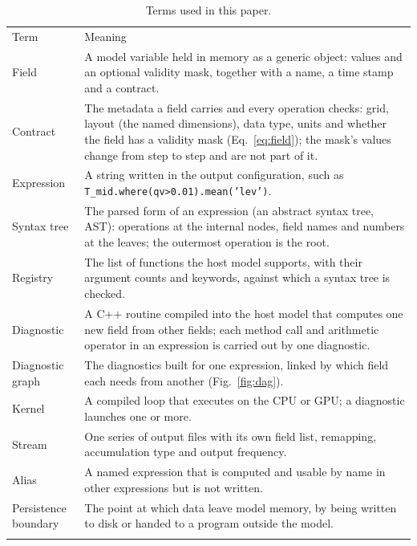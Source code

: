 \documentclass[gmd, manuscript]{copernicus}
\begin{document}
\begin{table}[t]
\caption{Terms used in this paper.}
\label{tab:terms}
\small
\begin{tabularx}{\columnwidth}{>{\raggedright\arraybackslash}p{3.0cm}>{\raggedright\arraybackslash}X}
\tophline
Term & Meaning \\
\middlehline
Field & A model variable held in memory as a generic object: values and an optional validity mask, together with a name, a time stamp and a contract. \\
Contract & The metadata a field carries and every operation checks: grid, layout (the named dimensions), data type, units and whether the field has a validity mask (Eq.~\ref{eq:field}); the mask's values change from step to step and are not part of it. \\
Expression & A string written in the output configuration, such as \texttt{T\_mid.where(qv>0.01).mean('lev')}. \\
Syntax tree & The parsed form of an expression (an abstract syntax tree, AST): operations at the internal nodes, field names and numbers at the leaves; the outermost operation is the root. \\
Registry & The list of functions the host model supports, with their argument counts and keywords, against which a syntax tree is checked. \\
Diagnostic & A C++ routine compiled into the host model that computes one new field from other fields; each method call and arithmetic operator in an expression is carried out by one diagnostic. \\
Diagnostic graph & The diagnostics built for one expression, linked by which field each needs from another (Fig.~\ref{fig:dag}). \\
Kernel & A compiled loop that executes on the CPU or GPU; a diagnostic launches one or more. \\
Stream & One series of output files with its own field list, remapping, accumulation type and output frequency. \\
Alias & A named expression that is computed and usable by name in other expressions but is not written. \\
Persistence boundary & The point at which data leave model memory, by being written to disk or handed to a program outside the model. \\
\bottomhline
\end{tabularx}
\normalsize
\end{table}
\end{document}
